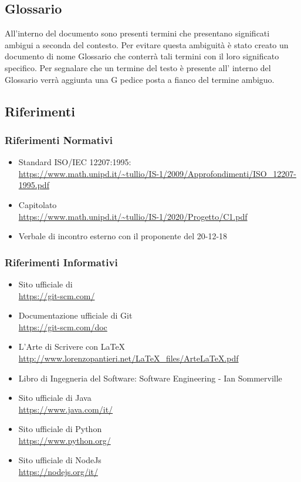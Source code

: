 \subsection{Glossario}
All’interno del  documento sono presenti termini che presentano significati ambigui a seconda del contesto.
Per evitare questa ambiguità è stato creato un  documento di nome Glossario che  conterrà tali termini con il loro significato specifico. Per segnalare che un termine del testo è presente all’ interno del Glossario  
verrà aggiunta una G pedice posta a fianco del termine ambiguo. 

\subsection{Riferimenti}
\subsubsection{Riferimenti Normativi}
\begin{itemize}
\item{Standard ISO/IEC 12207:1995: \\
\url{https://www.math.unipd.it/~tullio/IS-1/2009/Approfondimenti/ISO_12207-1995.pdf}}
\item{Capitolato \\
\url{https://www.math.unipd.it/~tullio/IS-1/2020/Progetto/C1.pdf}}
\item{Verbale di incontro esterno con il proponente  del 20-12-18}
\end{itemize}

\subsubsection{Riferimenti Informativi}
\begin{itemize}
\item{Sito ufficiale di  \\
\url{https://git-scm.com/}}
\item{Documentazione ufficiale di Git} \\
\url{https://git-scm.com/doc}
\item{L’Arte di Scrivere con \LaTeX \\
\url{http://www.lorenzopantieri.net/LaTeX_files/ArteLaTeX.pdf}}
\item{Libro di Ingegneria del Software: Software Engineering - Ian Sommerville}
\item{Sito ufficiale di Java} \\
\url{https://www.java.com/it/}
\item{Sito ufficiale di Python} \\
\url{https://www.python.org/}
\item{Sito ufficiale di NodeJs} \\
\url{https://nodejs.org/it/}
\end{itemize}
